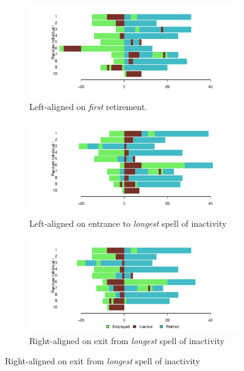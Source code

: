 \documentclass{article}
\begin{document}
 \begin{figure}[ht!]
\centering
\caption{Alignment on transient states.}
\label{fig:alignment}
\begin{subfigure}{\textwidth}
\caption{Left-aligned on \emph{first} retirement.}
\label{fig:firstretire}
\includegraphics[scale=.6]{Figures/Seq10firstretirealign.pdf}
\end{subfigure}

\begin{subfigure}{\textwidth}
\caption{Left-aligned on entrance to \emph{longest} spell of inactivity}
\label{fig:longinactleft}
\includegraphics[scale=.6]{Figures/Seq10inactlongleft.pdf}
\end{subfigure}

\begin{subfigure}{\textwidth}
\caption{Right-aligned on exit from \emph{longest} spell of inactivity}
\label{fig:longinactright}
\includegraphics[scale=.6]{Figures/Seq10inactlongright.pdf}
\end{subfigure}

\end{figure}
\end{document}
